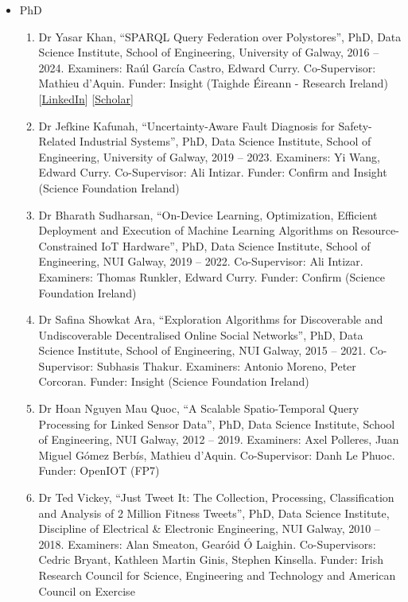 \documentclass[10pt,a4paper]{res} %
\begin{document}
\begin{resume}
\begin{itemize} \itemsep -2pt
\item PhD
\begin{enumerate} \itemsep -2pt
\item Dr Yasar Khan, ``SPARQL Query Federation over Polystores'', PhD, Data Science Institute, School of Engineering, University of Galway, 2016 -- 2024. Examiners: Ra\'{u}l Garc\'{i}a Castro, Edward Curry. Co-Supervisor: Mathieu d'Aquin. Funder: Insight (Taighde \'{E}ireann - Research Ireland) %
[\href{https://www.linkedin.com/in/yasarkhan1984/}{LinkedIn}]
[\href{https://scholar.google.com/citations?hl=en&user=taah8XYAAAAJ}{Scholar}]
\item Dr Jefkine Kafunah, ``Uncertainty-Aware Fault Diagnosis for Safety-Related Industrial Systems'', PhD, Data Science Institute, School of Engineering, University of Galway, 2019 -- 2023. Examiners: Yi Wang, Edward Curry. Co-Supervisor: Ali Intizar. Funder: Confirm and Insight (Science Foundation Ireland) %
\item Dr Bharath Sudharsan, ``On-Device Learning, Optimization, Efficient Deployment and Execution of Machine Learning Algorithms on Resource-Constrained IoT Hardware'', PhD, Data Science Institute, School of Engineering, NUI Galway, 2019 -- 2022. Co-Supervisor: Ali Intizar. Examiners: Thomas Runkler, Edward Curry. Funder: Confirm (Science Foundation Ireland) %
\item Dr Safina Showkat Ara, ``Exploration Algorithms for Discoverable and Undiscoverable Decentralised Online Social Networks'', PhD, Data Science Institute, School of Engineering, NUI Galway, 2015 -- 2021. Co-Supervisor: Subhasis Thakur. Examiners: Antonio Moreno, Peter Corcoran. Funder: Insight (Science Foundation Ireland) %
\item Dr Hoan Nguyen Mau Quoc, ``A Scalable Spatio-Temporal Query Processing for Linked Sensor Data'', PhD, Data Science Institute, School of Engineering, NUI Galway, 2012 -- 2019. Examiners: Axel Polleres, Juan Miguel G\'{o}mez Berb\'{i}s, Mathieu d'Aquin. Co-Supervisor: Danh Le Phuoc. Funder: OpenIOT (FP7) %
\item Dr Ted Vickey, ``Just Tweet It: The Collection, Processing, Classification and Analysis of 2 Million Fitness Tweets'', PhD, Data Science Institute, Discipline of Electrical \& Electronic Engineering, NUI Galway, 2010 -- 2018. Examiners: Alan Smeaton, Gear\'{o}id \'{O} Laighin. Co-Supervisors: Cedric Bryant, Kathleen Martin Ginis, Stephen Kinsella. Funder: Irish Research Council for Science, Engineering and Technology and American Council on Exercise %

\end{enumerate}
\end{itemize}
\end{resume}
\end{document}
